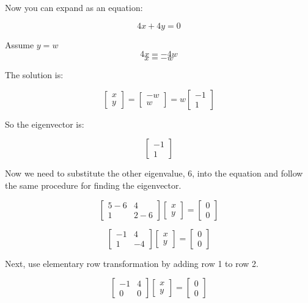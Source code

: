 Now you can expand as an equation:

$$4x + 4y = 0$$

Assume $y = w$
  $$4x = -4w$$
  $$x = -w$$

The solution is:

$$\begin{bmatrix}
x\\
y 
\end{bmatrix} = 
\begin{bmatrix}
-w \\
w 
\end{bmatrix} = 
w\begin{bmatrix}
-1\\
1
\end{bmatrix}$$

So the eigenvector is:

$$\begin{bmatrix}
-1\\
1
\end{bmatrix}$$

Now we need to substitute the other eigenvalue, 6, into the equation and follow the same procedure for finding the eigenvector. 

$$\begin{bmatrix}
5-6 & 4\\
 1 & 2-6 
\end{bmatrix}
\begin{bmatrix}
x  \\
y 
\end{bmatrix} = 
\begin{bmatrix}
0  \\
0 
\end{bmatrix}$$

$$\begin{bmatrix}
-1 & 4\\
 1 & -4
\end{bmatrix}
\begin{bmatrix}
x  \\
y 
\end{bmatrix} = 
\begin{bmatrix}
0  \\
0 
\end{bmatrix}$$

Next, use elementary row transformation by adding row 1 to row 2.

$$\begin{bmatrix}
-1 & 4 \\
 0 & 0 
\end{bmatrix}
\begin{bmatrix}
x\\
y
\end{bmatrix} = 
\begin{bmatrix}
0\\
0 
\end{bmatrix}$$

